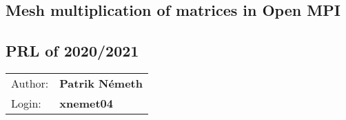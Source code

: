 \documentclass[pdftex, 11pt, a4paper, titlepage]{article}
\begin{document}
    \begin{center}
        \section*{Mesh multiplication of matrices in Open MPI}
        \subsection*{PRL of 2020/2021}
        \begin{tabular}{ l l }
            Author: & \textbf{Patrik Németh} \\
            Login: & \textbf{xnemet04}
        \end{tabular}
    \end{center}
\end{document}
